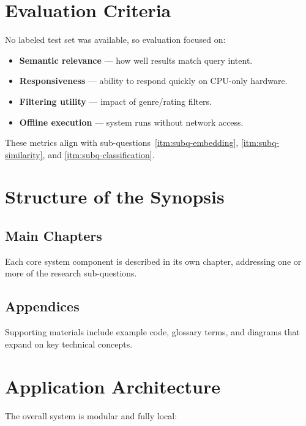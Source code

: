 \section{Evaluation Criteria}
\label{sec:evaluation-criteria}

No labeled test set was available, so evaluation focused on:

\begin{itemize}
    \item \textbf{Semantic relevance} — how well results match query intent.
    \item \textbf{Responsiveness} — ability to respond quickly on CPU-only hardware.
    \item \textbf{Filtering utility} — impact of genre/rating filters.
    \item \textbf{Offline execution} — system runs without network access.
\end{itemize}

These metrics align with sub-questions~\ref{itm:subq-embedding}, \ref{itm:subq-similarity}, and \ref{itm:subq-classification}.

\section{Structure of the Synopsis}
\label{sec:structure-synopsis}

\subsection{Main Chapters}
Each core system component is described in its own chapter, addressing one or more of the research sub-questions.

\subsection{Appendices}
Supporting materials include example code, glossary terms, and diagrams that expand on key technical concepts.

\section{Application Architecture}
\label{sec:application-architecture}

The overall system is modular and fully local:

